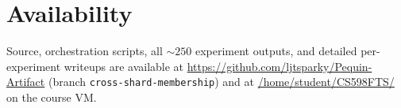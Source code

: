 \documentclass[letterpaper,twocolumn,10pt]{article}
\begin{document}
\section*{Availability}

Source, orchestration scripts, all $\sim 250$ experiment outputs, and
detailed per-experiment writeups are available at
\url{https://github.com/ljtsparky/Pequin-Artifact}
(branch \texttt{cross-shard-membership}) and at
\url{/home/student/CS598FTS/} on the course VM.





\end{document}
